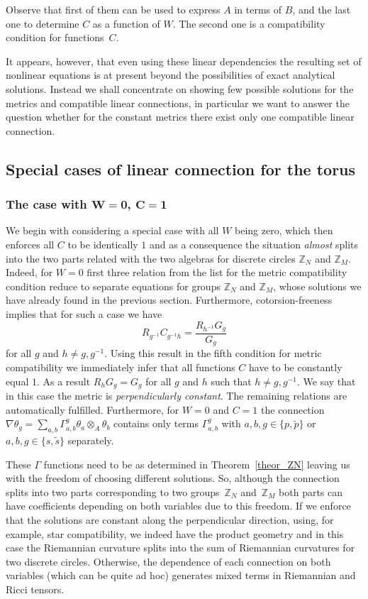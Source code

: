 \documentclass[pdftex]{sigma}
\numberwithin{equation}{section}
\newcommand{\ip}{{\tilde{p}}}
\newcommand{\is}{{\tilde{s}}}
\begin{document}
Observe that first of them can be used to express $A$ in terms of $B$, and the last one to determine $C$ as a function of $W$. The second one is a compatibility condition for functions~$C$.

It appears, however, that even using these linear dependencies the resulting set
of nonlinear equations is at present beyond the possibilities of exact analytical
solutions. Instead we shall concentrate on showing few possible solutions for
the metrics and compatible linear connections, in particular we want to answer
the question whether for the constant metrics there exist only one compatible
linear connection.

\subsection{Special cases of linear connection for the torus}

\subsubsection[The case with W=0, C=1]{The case with $\boldsymbol{W=0}$, $\boldsymbol{C=1}$}
We begin with considering a special case with all $W$ being zero, which then enforces all $C$ to be
identically $1$ and as a consequence the situation {\it almost} splits into the two parts related with the
two algebras for discrete circles $\mathbb{Z}_N$ and $\mathbb{Z}_M$.
Indeed, for $W=0$ first three relation from the list for the metric compatibility condition reduce to separate equations for groups $\mathbb{Z}_N$ and $\mathbb{Z}_M$, whose solutions we have already found in the previous section. Furthermore, cotorsion-freeness implies that for such a case we have
\[ R_{g^{-1}}C_{g^{-1}h}=\frac{R_{h^{-1}}G_g}{G_g}\]
for all $g$ and $h\neq g,g^{-1}$. Using this result in the fifth condition for metric compatibility we immediately infer that all functions $C$ have to be constantly equal $1$. As a result $R_{h}G_g=G_g$ for all $g$ and $h$ such that $h\neq g,g^{-1}$. We say that in this case the metric is {\it perpendicularly constant}. The remaining relations are automatically fulfilled. Furthermore, for $W=0$ and $C=1$ the connection $\nabla\theta_g=\sum_{a,b}\Gamma^g_{a,b}\theta_a\otimes_A\theta_b$ contains only terms $\Gamma^g_{a,b}$ with $a,b,g\in\{p,\ip\}$ or $a,b,g\in\{s,\is\}$ separately.

These $\Gamma$ functions need to be as determined in Theorem~\ref{theor_ZN} leaving us with the freedom of choosing different solutions. So, although the connection splits into two parts corresponding to two groups~$\mathbb Z_N$ and~$\mathbb Z_M$ both parts can have coefficients depending on both variables due to this freedom. If we enforce that the solutions are constant along the perpendicular direction, using, for example, star compatibility, we indeed have the product geometry and in this case the Riemannian curvature splits into the sum of Riemannian curvatures for two discrete circles. Otherwise, the dependence of each connection on both variables (which can be quite ad hoc) generates mixed terms in Riemannian and Ricci tensors.
\end{document}
